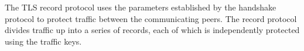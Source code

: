 The TLS record protocol \cite{rfc8446} uses the parameters established by the handshake protocol to protect traffic between the communicating peers. The record protocol divides traffic up into a series of records, each of which is independently protected
using the traffic keys.